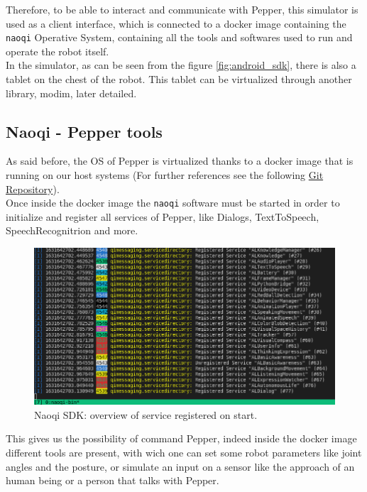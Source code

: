 \documentclass[12pt, letterpaper, twoside]{article}
\begin{document}
Therefore, to be able to interact and communicate with Pepper, this simulator is used as a client interface, which is connected to a docker image containing the \verb|naoqi| Operative System, containing all the tools and softwares used to run and operate the robot itself.\\
In the simulator, as can be seen from the figure \ref{fig:android_sdk}, there is also a tablet on the chest of the robot. This tablet can be virtualized through another library, modim, later detailed.

\subsection{Naoqi - Pepper tools}
As said before, the OS of Pepper is virtualized thanks to a docker image that is running on our host systems (For further references see the following \href{https://bitbucket.org/iocchi/hri_software/src/master/}{Git Repository}).\\
Once inside the docker image the \verb|naoqi| software must be started in order to initialize and register all services of Pepper, like Dialogs, TextToSpeech, SpeechRecognitrion and more.\\

\begin{figure}[htbp]
	\centerline{\includegraphics[scale=.6]{img/naoqi.png}}
	\caption{Naoqi SDK: overview of service registered on start.}
	\label{fig}
\end{figure}

This gives us the possibility of command Pepper, indeed inside the docker image different tools are present, with wich one can set some robot parameters like joint angles and the posture, or simulate an input on a sensor like the approach of an human being or a person that talks with Pepper.\\
\end{document}

